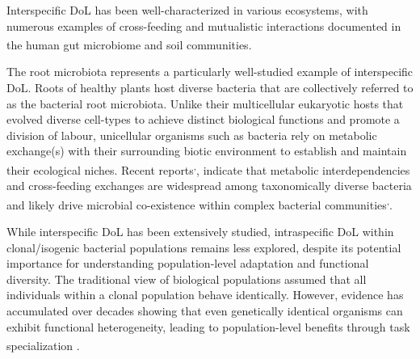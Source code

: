 \documentclass[
  11pt,
  a4paper,
]{report}
\begin{document}
Interspecific DoL has been well-characterized in various ecosystems,
with numerous examples of cross-feeding and mutualistic interactions
documented in the human gut microbiome and soil
communities\textsuperscript{}.

The root microbiota represents a particularly well-studied example of
interspecific DoL. Roots of healthy plants host diverse bacteria that
are collectively referred to as the bacterial root microbiota. Unlike
their multicellular eukaryotic hosts that evolved diverse cell-types to
achieve distinct biological functions and promote a division of labour,
unicellular organisms such as bacteria rely on metabolic exchange(s)
with their surrounding biotic environment to establish and maintain
their ecological niches. Recent
reports\textsuperscript{,},
indicate that metabolic interdependencies and cross-feeding exchanges
are widespread among taxonomically diverse bacteria and likely drive
microbial co-existence within complex bacterial
communities\textsuperscript{,}.

While interspecific DoL has been extensively studied, intraspecific DoL
within clonal/isogenic bacterial populations remains less explored,
despite its potential importance for understanding population-level
adaptation and functional diversity. The traditional view of biological
populations assumed that all individuals within a clonal population
behave identically. However, evidence has accumulated over decades
showing that even genetically identical organisms can exhibit functional
heterogeneity, leading to population-level benefits through task
specialization\textsuperscript{}
\textsuperscript{}.
\end{document}
